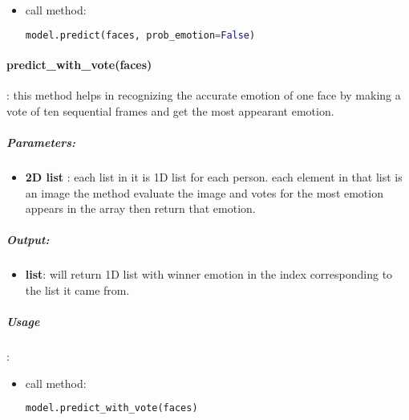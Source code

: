 
\begin{itemize}
	\item call method:
	\begin{lstlisting}[language=Python]
	model.predict(faces, prob_emotion=False)\end{lstlisting}
\end{itemize}

\paragraph{predict\_with\_vote(faces)}:
this method helps in recognizing the accurate emotion of one face by making a vote of ten sequential frames and get the most appearant emotion. \newline

\subparagraph{Parameters:}
\begin{changemargin}{0.5cm}{0cm}
\begin{itemize}
	\item \textbf{2D list }:\newline
	each list in it is 1D list for each person. each element in that list is an image the method evaluate the image and votes for the most emotion appears in the array then return that emotion.
\end{itemize}
\end{changemargin}

\subparagraph{Output:}
\begin{changemargin}{0.5cm}{0cm}
\begin{itemize}
	\item \textbf{list}:\newline
	will return 1D list with winner emotion in the index corresponding to the list it came from.
\end{itemize}
\end{changemargin}

\subparagraph{Usage}:
\begin{changemargin}{0.5cm}{0cm}

\begin{itemize}
	\item call method:
	\begin{lstlisting}[language=Python]
	model.predict_with_vote(faces)\end{lstlisting}
\end{itemize}
\end{changemargin}


